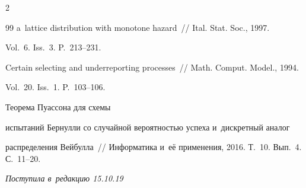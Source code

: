 \begin{multicols}{2}
{{\begin{thebibliography}{99}
a~lattice distribution with monotone hazard~// Ital. Stat. Soc., 1997. 

Vol.~6. Iss.~3. P.~213--231.





Certain selecting and underreporting processes~// Math. Comput. Model., 1994. 

Vol.~20. Iss.~1. P.~103--106.




 Теорема Пуассона для схемы

испытаний Бернулли со случайной вероятностью успеха и~дискретный аналог

распределения Вейбулла~// Информатика и~её применения, 2016. Т.~10. Вып.~4. С.~11--20.



 \end{thebibliography}



 }

 }



\end{multicols}



\vspace*{-6pt}



\hfill{\small\textit{Поступила в~редакцию 15.10.19}}









\newpage



\vspace*{-28pt}















